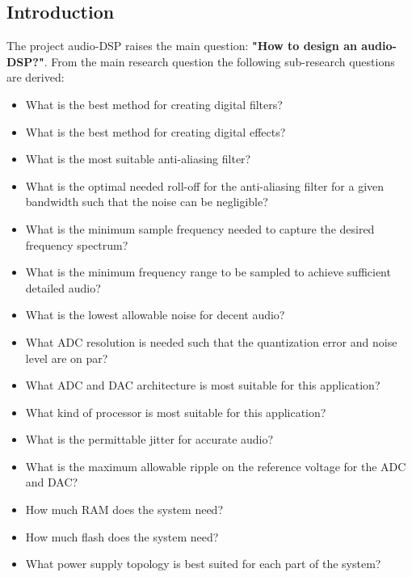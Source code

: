 \documentclass[11pt, a4paper]{report}
\begin{document}
\begin{justify}

\newpage
\tableofcontents
\thispagestyle{empty}

\listoffigures
\thispagestyle{empty}

\listoftables
\thispagestyle{empty}

\newpage
\pagestyle{plain}
\setcounter{page}{1}

\chapter{Introduction}
The project audio-DSP raises the main question: \textbf{"How to design an audio-DSP?"}. From the main research question the following sub-research questions are derived:

\begin{itemize}
\item What is the best method for creating digital filters?
\item What is the best method for creating digital effects?
\item What is the most suitable anti-aliasing filter?
\item What is the optimal needed roll-off for the anti-aliasing filter for a given bandwidth such that the noise can be negligible?
\item What is the minimum sample frequency needed to capture the desired frequency spectrum?
\item What is the minimum frequency range to be sampled to achieve sufficient detailed audio?
\item What is the lowest allowable noise for decent audio?
\item What ADC resolution is needed such that the quantization error and noise level are on par?
\item What ADC and DAC architecture is most suitable for this application?
\item What kind of processor is most suitable for this application?
\item What is the permittable jitter for accurate audio?
\item What is the maximum allowable ripple on the reference voltage for the ADC and DAC?
\item How much RAM does the system need?
\item How much flash does the system need?
\item What power supply topology is best suited for each part of the system?
\end{itemize}


\end{justify}
\end{document}
